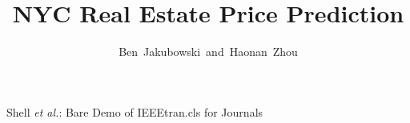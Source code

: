 \documentclass[journal]{IEEEtran}
\begin{document}
%

\title{NYC Real Estate Price Prediction}
%
%
%

\author{Ben~Jakubowski~and~Haonan~Zhou}

% 
%



%
{Shell \MakeLowercase{\textit{et al.}}: Bare Demo of IEEEtran.cls for Journals}
% 




\end{document}
